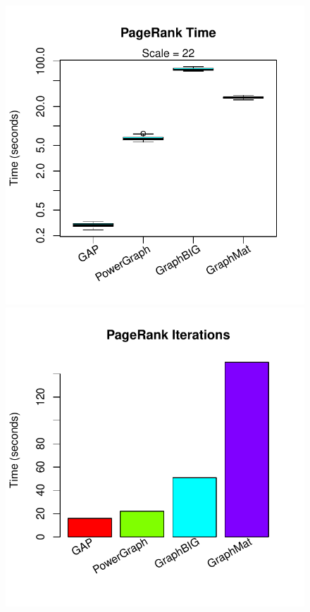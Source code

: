 \documentclass[conference]{IEEEtran}
\begin{document}
\begin{figure}
	\centering
	\begin{minipage}{0.48\linewidth}
		\includegraphics[width=\linewidth, trim=0pt 18pt 18pt 0pt, clip]{graphics/pr_time.pdf}
	\end{minipage}
	\begin{minipage}{0.48\linewidth}
		\includegraphics[width=\linewidth, trim=0 18pt 18pt 0pt, clip]{graphics/pr_iters.pdf}

\end{minipage}
\end{figure}
\end{document}
